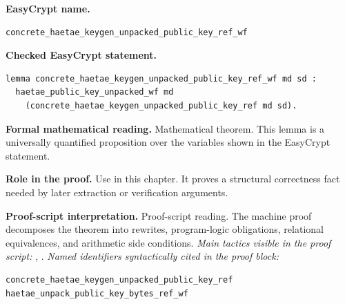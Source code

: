 \begin{formaltheorem}
\noindent\textbf{EasyCrypt name.}
\begin{lstlisting}[language=EasyCrypt,basicstyle=\ttfamily\scriptsize]
concrete_haetae_keygen_unpacked_public_key_ref_wf
\end{lstlisting}
\noindent\textbf{Checked EasyCrypt statement.}
\begin{lstlisting}[language=EasyCrypt,basicstyle=\ttfamily\scriptsize]
lemma concrete_haetae_keygen_unpacked_public_key_ref_wf md sd :
  haetae_public_key_unpacked_wf md
    (concrete_haetae_keygen_unpacked_public_key_ref md sd).
\end{lstlisting}
\noindent\textbf{Formal mathematical reading.}
Mathematical theorem. This lemma is a universally quantified proposition over the variables shown in the EasyCrypt statement.

\noindent\textbf{Role in the proof.}
Use in this chapter. It proves a structural correctness fact needed by later extraction or verification arguments.

\noindent\textbf{Proof-script interpretation.}
Proof-script reading. The machine proof decomposes the theorem into rewrites, program-logic obligations, relational equivalences, and arithmetic side conditions.
\emph{Main tactics visible in the proof script:} , .
\emph{Named identifiers syntactically cited in the proof block:}
\begin{lstlisting}[language=EasyCrypt,basicstyle=\ttfamily\scriptsize]
concrete_haetae_keygen_unpacked_public_key_ref
haetae_unpack_public_key_bytes_ref_wf
\end{lstlisting}

\end{formaltheorem}

